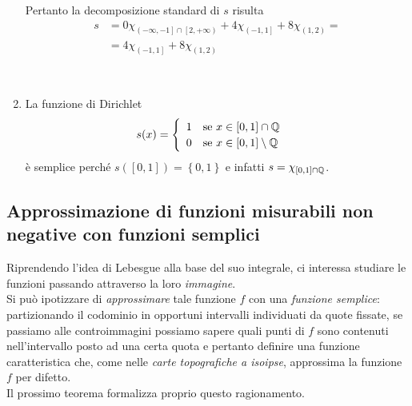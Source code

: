 \begin{examples}
\begin{enumerate}
\begin{minipage}{0.55\textwidth}
		Pertanto la decomposizione standard di $s$ risulta
		\begin{align*}
			s&=0\chi_{\left(-\infty,-1\right]\cap\left[2,+\infty\right)}+4\chi_{\left(-1,1\right]}+8\chi_{\left(1,2\right)}=\\
			&=4\chi_{\left(-1,1\right]}+8\chi_{\left(1,2\right)}
		\end{align*}
		\end{minipage}\vspace{3mm}\\
	\item La funzione di Dirichlet
		\begin{equation*}
		s(x)=
		\begin{cases}
			\begin{array}{ll}
				1&\text{se }x\in\left[0,1\right]\cap\mathbb{Q}\\
				0&\text{se }x\in\left[0,1\right]\setminus\mathbb{Q}\\
			\end{array}
		\end{cases}
	\end{equation*}
	è semplice perché $s\left(\left[0,1\right]\right)=\left\{0,1\right\}$ e infatti $s=\chi_{\left[0,1\right]\cap\mathbb{Q}}$.
	\end{enumerate}
\end{examples}
\begin{minipage}{0.55\textwidth}
\subsection{Approssimazione di funzioni misurabili non negative con funzioni semplici}
Riprendendo l'idea di Lebesgue alla base del suo integrale, ci interessa studiare le funzioni passando attraverso la loro \textit{immagine}.\\
Si può ipotizzare di \textit{approssimare} tale funzione $f$ con una \textit{funzione semplice}: partizionando il codominio in opportuni intervalli individuati da quote fissate, se passiamo alle controimmagini possiamo sapere quali punti di $f$ sono contenuti nell'intervallo posto ad una certa quota e pertanto definire una funzione caratteristica che, come nelle \textit{carte topografiche a isoipse}, approssima la funzione $f$ per difetto.\\
Il prossimo teorema formalizza proprio questo ragionamento.
\end{minipage}\hspace{2mm}
